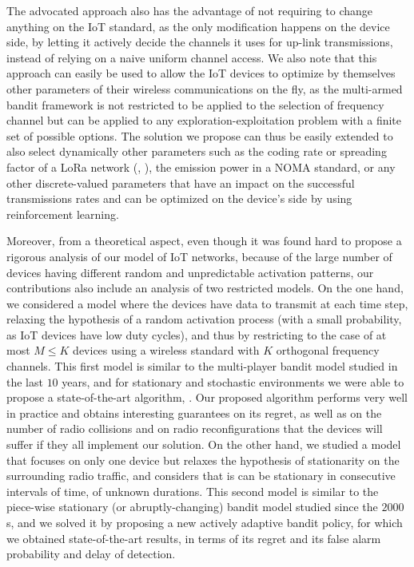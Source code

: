 The advocated approach also has the advantage of not requiring to change anything on the IoT standard, as the only modification happens on the device side, by letting it actively decide the channels it uses for up-link transmissions, instead of relying on a naive uniform channel access.
%
We also note that this approach can easily be used to allow the IoT devices to optimize by themselves other parameters of their wireless communications on the fly, as the multi-armed bandit framework is not restricted to be applied to the selection of frequency channel but can be applied to any exploration-exploitation problem with a finite set of possible options.
The solution we propose can thus be easily extended to also select dynamically other parameters such as the coding rate or spreading factor of a LoRa network (\eg, \cite{KerkoucheAlami18}), the emission power in a NOMA standard, or any other discrete-valued parameters that have an impact on the successful transmissions rates and can be optimized on the device's side by using reinforcement learning.


Moreover, from a theoretical aspect, even though it was found hard to propose a rigorous analysis of our model of IoT networks, because of the large number of devices having different random and unpredictable activation patterns, our contributions also include an analysis of two restricted models.
%
On the one hand, we considered a model where the devices have data to transmit at each time step, relaxing the hypothesis of a random activation process (with a small probability, as IoT devices have low duty cycles), and thus by restricting to the case of at most $M \leq K$ devices using a wireless standard with $K$ orthogonal frequency channels.
This first model is similar to the multi-player bandit model studied in the last $10$ years, and for stationary and stochastic environments we were able to propose a state-of-the-art algorithm, \MCTopM.
Our proposed algorithm performs very well in practice and obtains interesting guarantees on its regret, as well as on the number of radio collisions and on radio reconfigurations that the devices will suffer if they all implement our solution.
%
On the other hand, we studied a model that focuses on only one device but relaxes the hypothesis of stationarity on the surrounding radio traffic, and considers that is can be stationary in consecutive intervals of time, of unknown durations. This second model is similar to the piece-wise stationary (or abruptly-changing) bandit model studied since the $2000$s, and we solved it by proposing a new actively adaptive bandit policy, for which we obtained state-of-the-art results, in terms of its regret and its false alarm probability and delay of detection.

